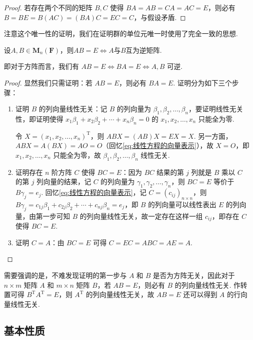 \begin{proof}
    若存在两个不同的矩阵 $B,C$ 使得 $BA=AB=CA=AC=E$，则必有 $B=BE=B(AC)=(BA)C=EC=C$，与假设矛盾.
\end{proof}
注意这个唯一性的证明，我们在证明群的单位元唯一时使用了完全一致的思想.

\begin{theorem}{}{}
    设$A,B\in \mathbf{M}_n(\mathbf{F})$，则$AB=E \iff A$与$B$互为逆矩阵.
\end{theorem}
即对于方阵而言，我们有 $AB = E \iff BA = E \iff A, B$ 可逆.
\begin{proof}
    显然我们只需证明：若 $AB = E$，则必有 $BA = E$. 证明分为如下三个步骤：
    \begin{enumerate}
        \item 证明 $B$ 的列向量线性无关：记 $B$ 的列向量为 $\beta_1,\beta_2,\ldots,\beta_n$，要证明线性无关性，即证明使得 $x_1\beta_1 + x_2\beta_2 + \cdots + x_n\beta_n = 0$ 的 $x_1,x_2,\ldots,x_n$ 只能全为零.

        令 $X = (x_1,x_2,\ldots,x_n)^\mathrm{T}$，则 $ABX = (AB)X = EX = X$. 另一方面，$ABX = A(BX) = AO = O$（回忆\autoref{eq:线性方程的向量表示}），故 $X = O$，即 $x_1,x_2,\ldots,x_n$ 只能全为零，故 $\beta_1,\beta_2,\ldots,\beta_n$ 线性无关.

        \item 证明存在 $n$ 阶方阵 $C$ 使得 $BC = E$：因为 $BC$ 结果的第 $j$ 列就是 $B$ 乘以 $C$ 的第 $j$ 列向量的结果，记 $C$ 的列向量为 $\gamma_1,\gamma_2,\ldots,\gamma_n$，则 $BC = E$ 等价于 $B\gamma_j = e_j$. 回忆\autoref{eq:线性方程的向量表示}，记 $C = (c_{ij})_{n \times n}$，则 $B\gamma_j = c_{1j}\beta_1 + c_{2j}\beta_2 + \cdots + c_{nj}\beta_n = e_j$，即 $B$ 的列向量可以线性表出 $E$ 的列向量，由第一步可知 $B$ 的列向量线性无关，故一定存在这样一组 $c_{ij}$，即存在 $C$ 使得 $BC = E$.

        \item 证明 $C = A$：由 $BC = E$ 可得 $C = EC = ABC = AE = A$.
    \end{enumerate}
\end{proof}

需要强调的是，不难发现证明的第一步与 $A$ 和 $B$ 是否为方阵无关，因此对于 $n \times m$ 矩阵 $A$ 和 $m \times n$ 矩阵 $B$，若 $AB = E$，则必有 $B$ 的列向量线性无关. 作转置可得 $B^\mathrm{T}A^\mathrm{T} = E$，则 $A^\mathrm{T}$ 的列向量线性无关，故 $AB = E$ 还可以得到 $A$ 的行向量线性无关.

\subsection{基本性质}

